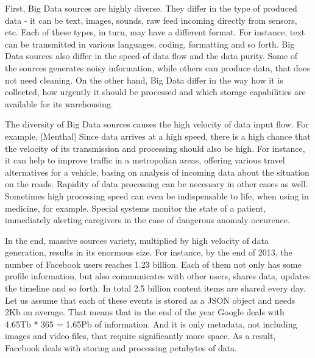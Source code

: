 First, Big Data sources are highly diverse.
They differ in the type of produced data - it can be text, images, sounds, raw feed incoming directly from sensors, etc.
Each of these types, in turn, may have a different format.
For instance, text can be transmitted in various languages, coding, formatting and so forth.
Big Data sources also differ in the speed of data flow and the data purity.  
Some of the sources generates noisy information, while others can produce data, that does not need cleaning.
On the other hand, Big Data differ in the way how it is collected, how urgently it should be processed and which storage capabilities are available for its warehousing.

The diversity of Big Data sources causes the high velocity of data input flow.
For example, [Menthal]
Since data arrives at a high speed, there is a high chance that the velocity of its transmission and processing should also be high.
For instance, it can help to improve traffic in a metropolian areas, offering various travel alternatives for a vehicle, basing on analysis of incoming data about the situation on the roads.
Rapidity of data processing can be necessary in other cases as well.
Sometimes high processing speed can even be indispensable to life, when using in medicine, for example.
Special systems monitor the state of a patient, immediately alerting caregivers in the case of dangerous anomaly occurence. 

In the end, massive sources variety, multiplied by high velocity of data generation, results in its enormous size.
For instance, by the end of 2013, the number of Facebook users reaches 1.23 billion.
Each of them not only has some profile information, but also communicates with other users, shares data, updates the timeline and so forth.
In total 2.5 billion content items are shared every day.
Let us assume that each of these events is stored as a JSON object and needs 2Kb on average.
That means that in the end of the year Google deals with 4.65Tb * 365 = 1.65Pb of information.
And it is only metadata, not including images and video files, that require significantly more space. 
As a result, Facebook deals with storing and processing petabytes of data.

